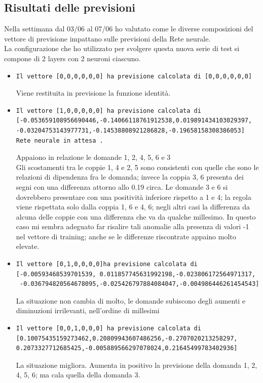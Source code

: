 \subsection{Risultati delle previsioni}
\label{Risultati delle previsioni}
Nella settimana dal 03/06 al 07/06 ho valutato come le diverse composizioni del vettore di previsione impattano sulle previsioni della Rete neurale.\\
La configurazione che ho utilizzato per svolgere questa nuova serie di test si compone di 2 layers con 2 neuroni ciascuno.
\begin{itemize}
\item \begin{verbatim}Il vettore [0,0,0,0,0,0] ha previsione calcolata di [0,0,0,0,0,0]
\end{verbatim}
Viene restituita in previsione la funzione identit\`a.

\item \begin{verbatim}Il vettore [1,0,0,0,0,0] ha previsione calcolata di
[-0.053659108956690446,-0.14066118761912538,0.019891434103029397,
-0.03204753143977731,-0.14538808921286828,-0.19658158308386053]
Rete neurale in attesa .
\end{verbatim}
Appaiono in relazione le domande 1, 2, 4, 5, 6 e 3\\
Gli scostamenti tra le coppie 1, 4 e 2, 5 sono consistenti con quelle che sono le relazioni di dipendenza fra le domanda; invece la coppia 3, 6 presenta dei segni con una differenza attorno allo 0.19 circa.
Le domande 3 e 6 si dovrebbero presentare con una positivit\`a inferiore rispetto a 1 e 4; la regola viene rispettata solo dalla coppia 1, 6 e 4, 6; negli altri casi la differenza da alcuna delle coppie con una differenza che va da qualche millesimo. In questo caso  mi sembra adeguato far risalire tali anomalie alla presenza di valori -1 nel vettore di training; anche se le differenze riscontrate appaino molto elevate.


\item \begin{verbatim}Il vettore [0,1,0,0,0,0]ha previsione calcolata di
[-0.00593468539701539, 0.011857745631992198,-0.023806172564971317,
 -0.036794820564678095,-0.025426797884084047,-0.004986446261454543]
\end{verbatim}
La situazione non cambia di molto, le domande subiscono degli aumenti e diminuzioni irrilevanti, nell'ordine di millesimi

\item \begin{verbatim}Il vettore [0,0,1,0,0,0] ha previsione calcolata di
[0.10075435159273462,0.20809943607486256,-0.2707020213258297,
0.2073327712685425,-0.005889566297078024,0.21645499783402936]
\end{verbatim}
La situazione migliora. Aumenta in positivo la previsione della domanda 1, 2, 4, 5, 6; ma cala quella della domanda 3.



\end{itemize}
